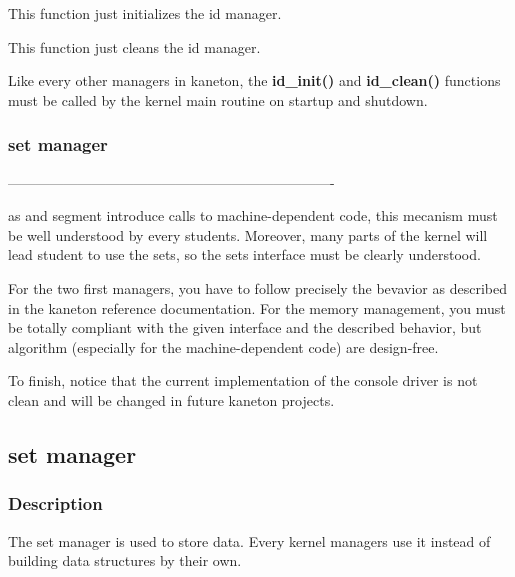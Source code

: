 
This function just initializes the id manager.


This function just cleans the id manager.

Like every other managers in kaneton, the \textbf{id\_init()} and
\textbf{id\_clean()} functions must be called by the kernel main
routine on startup and shutdown.

%
%

\subsubsection{set manager}







----------------------------------------------------------------------

as  and  segment  introduce  calls  to  machine-dependent  code,  this
mecanism  must be well  understood by  every students.  Moreover, many
parts of  the kernel will  lead student to  use the sets, so  the sets
interface must be clearly understood.

For the two first managers,  you have to follow precisely the bevavior
as described  in the kaneton  reference documentation. For  the memory
management, you must be totally compliant with the given interface and
the   described   behavior,   but   algorithm  (especially   for   the
machine-dependent code) are design-free.

To  finish, notice  that  the current  implementation  of the  console
driver is not clean and will be changed in future kaneton projects.

%
%

%
%

\subsection{set manager}

\subsubsection{Description}

The set  manager is used to  store data. Every kernel  managers use it
instead of building data structures by their own.

